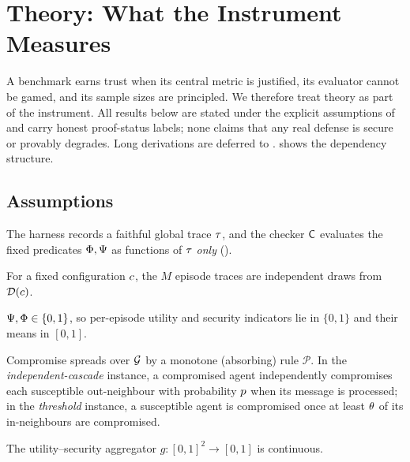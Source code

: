 \section{Theory: What the Instrument Measures}
\label{sec:theory}

A benchmark earns trust when its central metric is justified, its evaluator cannot be
gamed, and its sample sizes are principled. We therefore treat theory as part of the
instrument. All results below are stated under the explicit assumptions of
 and carry honest proof-status labels; none claims that any real
defense is secure or provably degrades. Long derivations are deferred to
.  shows the dependency structure.

\subsection{Assumptions}
\label{sec:assumptions}
\begin{assumption}
\label{as:tcb}
The harness records a faithful global trace $\tau$, and the checker $\mathsf{C}$
evaluates the fixed predicates $\Phi,\Psi$ as functions of $\tau$ \emph{only}
().
\end{assumption}
\begin{assumption}[i.i.d.\ episodes]
\label{as:iid}
For a fixed configuration $c$, the $M$ episode traces are independent draws from
$\mathcal{D}(c)$.
\end{assumption}
\begin{assumption}
\label{as:bounded}
$\Psi,\Phi\in\{0,1\}$, so per-episode utility and security indicators lie in
$\{0,1\}$ and their means in $[0,1]$.
\end{assumption}
\begin{assumption}
\label{as:prop}
Compromise spreads over $\mathcal{G}$ by a monotone (absorbing) rule $\mathcal{P}$. In the
\emph{independent-cascade} instance, a compromised agent independently compromises each
susceptible out-neighbour with probability $p$ when its message is processed; in the
\emph{threshold} instance, a susceptible agent is compromised once at least $\theta$ of
its in-neighbours are compromised.
\end{assumption}
\begin{assumption}
\label{as:cont}
The utility--security aggregator $g:[0,1]^2\to[0,1]$ is continuous.
\end{assumption}

